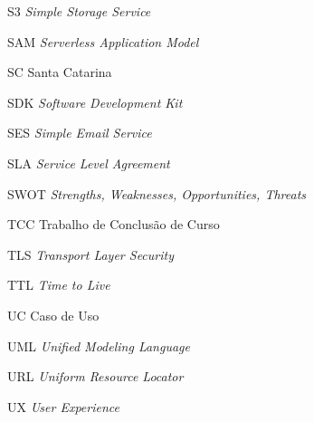 \begin{siglas}
  \item[S3] \textit{Simple Storage Service}
  \item[SAM] \textit{Serverless Application Model}
  \item[SC] Santa Catarina
  \item[SDK] \textit{Software Development Kit}
  \item[SES] \textit{Simple Email Service}
  \item[SLA] \textit{Service Level Agreement}
  \item[SWOT] \textit{Strengths, Weaknesses, Opportunities, Threats}
  \item[TCC] Trabalho de Conclusão de Curso
  \item[TLS] \textit{Transport Layer Security}
  \item[TTL] \textit{Time to Live}
  \item[UC] Caso de Uso
  \item[UML] \textit{Unified Modeling Language}
  \item[URL] \textit{Uniform Resource Locator}
  \item[UX] \textit{User Experience}
\end{siglas}


\tableofcontents*
\cleardoublepage

